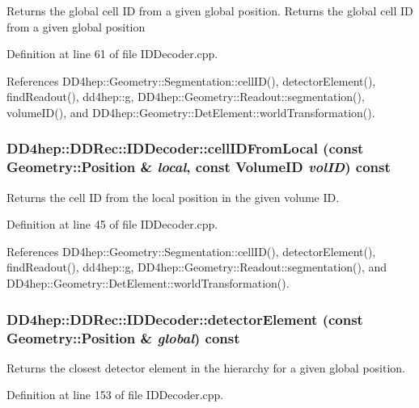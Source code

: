 Returns the global cell ID from a given global position. Returns the global cell ID from a given global position 

Definition at line 61 of file IDDecoder.cpp.

References DD4hep::Geometry::Segmentation::cellID(), detectorElement(), findReadout(), dd4hep::g, DD4hep::Geometry::Readout::segmentation(), volumeID(), and DD4hep::Geometry::DetElement::worldTransformation().\hypertarget{class_d_d4hep_1_1_d_d_rec_1_1_i_d_decoder_a6a03404cec542464c5dd2d09e92ee5e4}{
\subsubsection[{cellIDFromLocal}]{ DD4hep::DDRec::IDDecoder::cellIDFromLocal (const {\bf Geometry::Position} \& {\em local}, \/  const {\bf VolumeID} {\em volID}) const}}
\label{class_d_d4hep_1_1_d_d_rec_1_1_i_d_decoder_a6a03404cec542464c5dd2d09e92ee5e4}


Returns the cell ID from the local position in the given volume ID. 

Definition at line 45 of file IDDecoder.cpp.

References DD4hep::Geometry::Segmentation::cellID(), detectorElement(), findReadout(), dd4hep::g, DD4hep::Geometry::Readout::segmentation(), and DD4hep::Geometry::DetElement::worldTransformation().\hypertarget{class_d_d4hep_1_1_d_d_rec_1_1_i_d_decoder_afb1d47dbcaca600ccbc8e9269eec0563}{
\subsubsection[{detectorElement}]{ DD4hep::DDRec::IDDecoder::detectorElement (const {\bf Geometry::Position} \& {\em global}) const}}
\label{class_d_d4hep_1_1_d_d_rec_1_1_i_d_decoder_afb1d47dbcaca600ccbc8e9269eec0563}


Returns the closest detector element in the hierarchy for a given global position. 

Definition at line 153 of file IDDecoder.cpp.

